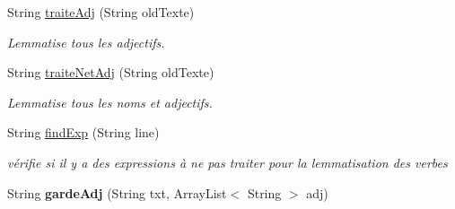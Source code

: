 \begin{DoxyCompactItemize}
String \hyperlink{classlemmatiseur_1_1_lefff_a960e92d433f0ebf28b7d26fc35412547}{traite\+Adj} (String old\+Texte)
\begin{DoxyCompactList}\small\item\em Lemmatise tous les adjectifs. \end{DoxyCompactList}\item 
String \hyperlink{classlemmatiseur_1_1_lefff_a7772cc31ac1855fdf7080b886b23e393}{traite\+Net\+Adj} (String old\+Texte)
\begin{DoxyCompactList}\small\item\em Lemmatise tous les noms et adjectifs. \end{DoxyCompactList}\item 
String \hyperlink{classlemmatiseur_1_1_lefff_abf6050c2918c16ed1f6372bf53c635e6}{find\+Exp} (String line)
\begin{DoxyCompactList}\small\item\em vérifie si il y a des expressions à ne pas traiter pour la lemmatisation des verbes \end{DoxyCompactList}\item 
String {\bfseries garde\+Adj} (String txt, Array\+List$<$ String $>$ adj)\hypertarget{classlemmatiseur_1_1_lefff_a387848135c1e00f7ddcd64813e3bcc36}{}\label{classlemmatiseur_1_1_lefff_a387848135c1e00f7ddcd64813e3bcc36}


\end{DoxyCompactItemize}
